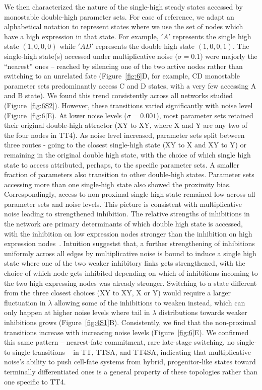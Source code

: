 \documentclass[11pt]{article}
\begin{document}
We then characterized the nature of the single-high steady states accessed by monostable double-high parameter sets. For ease of reference, we adapt an alphabetical notation to represent states where we use the set of nodes which have a high expression in that state. For example, $'A'$ represents the single high state $(1, 0, 0, 0)$ while $'AD'$ represents the double high state $(1, 0, 0, 1)$. The single-high state(s) accessed under multiplicative noise ($\sigma = 0.1$) were majorly the ``nearest'' ones -- reached by silencing one of the two active nodes rather than switching to an unrelated fate (Figure~\ref{fig:6}D, for example, CD monostable parameter sets predominantly access C and D states, with a very few accessing A and B state). We found this trend consistently across all networks studied (Figure~\ref{fig:6S2}). However, these transitions varied significantly with noise level (Figure~\ref{fig:6}E). At lower noise levels ($\sigma = 0.001$), most parameter sets retained their original double-high attractor (XY to XY, where X and Y are any two of the four nodes in TT4). As noise level increased, parameter sets split between three routes - going to the closest single-high state (XY to X and XY to Y) or remaining in the original double high state, with the choice of which single high state to access attributed, perhaps, to the specific parameter sets. A smaller fraction of parameters also transition to other double-high states. Parameter sets accessing more than one single-high state also showed the proximity bias. Correspondingly, access to non-proximal single-high state remained low across all parameter sets and noise levels. This picture is consistent with multiplicative noise leading to strengthened inhibition. The relative strengths of inhibitions in the network are primary determinants of which double high state is accessed, with the inhibition on low expression nodes stronger than the inhibition on high expression nodes~\cite{Duddu2024MultistabilityDifferentiation}. Intuition suggestst that, a further strengthening of inhibitions uniformly across all edges by multiplicative noise is bound to induce a single high state where one of the two weaker inhibitory links gets strengthened, with the choice of which node gets inhibited depending on which of inhibitions incoming to the two high expressing nodes was already stronger. Switching to a state different from the three closest choices (XY to XY, X or Y) would require a larger fluctuation in $\lambda$ allowing some of the inhibitions to weaken instead, which can only happen at higher noise levels where tail in $\lambda$ distributions towards weaker inhibitions grows (Figure~\ref{fig:4S1}B). Consistently, we find that the non-proximal transitions increase with increasing noise levels (Figure~\ref{fig:6}E). We confirmed this same pattern -- nearest-fate commitment, rare late-stage switching, no single-to-single transitions -- in TT, TTSA, and TT4SA, indicating that multiplicative noise's ability to push cell-fate systems from hybrid, progenitor-like states toward terminally differentiated ones is a general property of these topologies rather than one specific to TT4.
\end{document}
